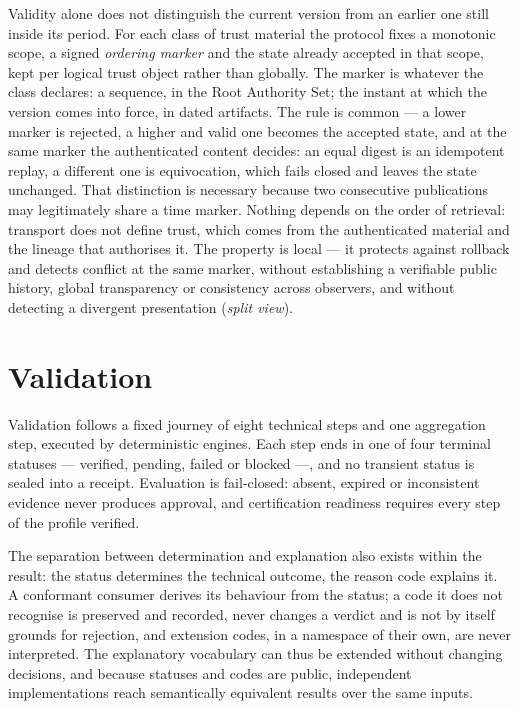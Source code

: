 \documentclass[journal abbreviation, manuscript]{copernicus}
\begin{document}
Validity alone does not distinguish the current version from an earlier one still inside its period. For each class of trust material the protocol fixes a monotonic scope, a signed \emph{ordering marker} and the state already accepted in that scope, kept per logical trust object rather than globally. The marker is whatever the class declares: a sequence, in the Root Authority Set; the instant at which the version comes into force, in dated artifacts. The rule is common --- a lower marker is rejected, a higher and valid one becomes the accepted state, and at the same marker the authenticated content decides: an equal digest is an idempotent replay, a different one is equivocation, which fails closed and leaves the state unchanged. That distinction is necessary because two consecutive publications may legitimately share a time marker. Nothing depends on the order of retrieval: transport does not define trust, which comes from the authenticated material and the lineage that authorises it. The property is local --- it protects against rollback and detects conflict at the same marker, without establishing a verifiable public history, global transparency or consistency across observers, and without detecting a divergent presentation (\emph{split view}).


\section{Validation}\label{sec:validation}

Validation follows a fixed journey of eight technical steps and one aggregation step, executed by deterministic engines. Each step ends in one of four terminal statuses --- verified, pending, failed or blocked ---, and no transient status is sealed into a receipt. Evaluation is fail-closed: absent, expired or inconsistent evidence never produces approval, and certification readiness requires every step of the profile verified.

The separation between determination and explanation also exists within the result: the status determines the technical outcome, the reason code explains it. A conformant consumer derives its behaviour from the status; a code it does not recognise is preserved and recorded, never changes a verdict and is not by itself grounds for rejection, and extension codes, in a namespace of their own, are never interpreted. The explanatory vocabulary can thus be extended without changing decisions, and because statuses and codes are public, independent implementations reach semantically equivalent results over the same inputs.
\end{document}
